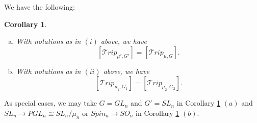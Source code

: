 \documentclass{amsart}
\theoremstyle{plain}
\newtheorem{corollary}{Corollary}[theorem]
\theoremstyle{definition}
\theoremstyle{remark}
\begin{document}
We have the following:
\begin{corollary}\label{slngln}
\begin{enumerate}[(a)]
    \item With notations as in $(i)$ above, we have
\[
[\mathcal{T}rip_{\mu',G'}]= [\mathcal{T}rip_{\mu,G}].
\]
\item With notations as in $(ii)$ above, we have
\[
[\mathcal{T}rip_{\mu_{1},G_{1}}]= [\mathcal{T}rip_{\mu_{2},G_{2}}].
\]
\end{enumerate}
\end{corollary}
As special cases, we may take $G=GL_n$ and $G'=SL_n$ in Corollary \ref{slngln} $(a)$ and $SL_n\rightarrow PGL_n\cong SL_{n}/\mu_{n}$ or $Spin_{n}\rightarrow SO_{n}$ in Corollary \ref{slngln} $(b)$.
\end{document}

